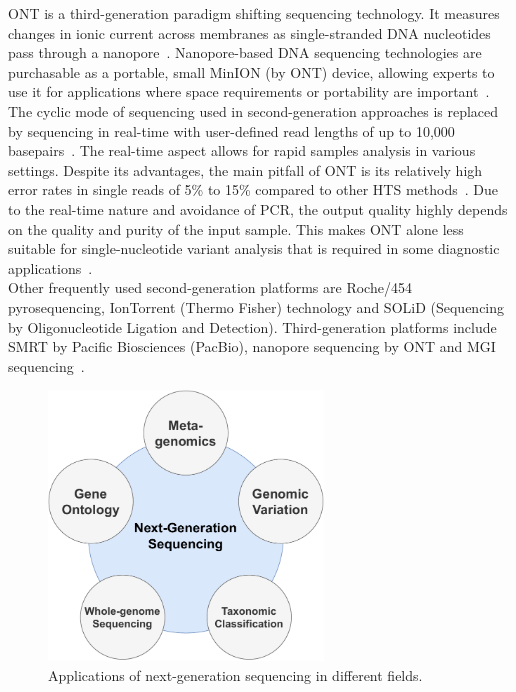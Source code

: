 \ac{ONT} is a third-generation paradigm shifting sequencing technology. It measures changes in ionic current across membranes as single-stranded \ac{DNA} nucleotides pass through a nanopore~\cite{jain2016oxford}. Nanopore-based \ac{DNA} sequencing technologies are purchasable as a portable, small MinION (by \ac{ONT}) device, allowing experts to use it for applications where space requirements or portability are important~\cite{greninger2015rapid, jain2016oxford}. The cyclic mode of sequencing used in second-generation approaches is replaced by sequencing in real-time with user-defined read lengths of up to 10,000 basepairs~\cite{jain2016oxford}. The real-time aspect allows for rapid samples analysis in various settings. Despite its advantages, the main pitfall of \ac{ONT} is its relatively high error rates in single reads of 5\% to 15\% compared to other \ac{HTS} methods~\cite{fu2019comparative, laver2015assessing}. Due to the real-time nature and avoidance of \ac{PCR}, the output quality highly depends on the quality and purity of the input sample. This makes \ac{ONT} alone less suitable for single-nucleotide variant analysis that is required in some diagnostic applications~\cite{bowden2019sequencing, stefan2022comparison}. \\
Other frequently used second-generation platforms are Roche/454 pyrosequencing, IonTorrent (Thermo Fisher) technology and SOLiD (Sequencing by Oligonucleotide Ligation and Detection). Third-generation platforms include \ac{SMRT} by Pacific Biosciences (PacBio), nanopore sequencing by \ac{ONT} and MGI sequencing~\cite{rhoads2015pacbio}. 

\begin{figure}[ht!]
	\centering
	\includegraphics[width=0.65\textwidth]{media/2-ngs.pdf}
	\caption{Applications of next-generation sequencing in different fields.}
	\label{fig:2-ngs}
\end{figure} 

